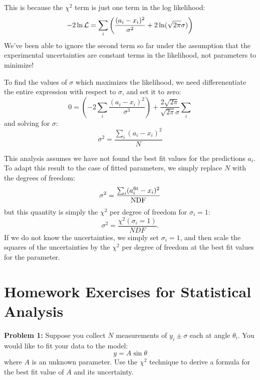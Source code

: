 \documentclass[12pt,oneside]{book}
\begin{document}
This is because the $\chi^2$ term is just one term in the log likelihood:
\begin{equation*}
-2 \ln {\cal L} = \sum_i \left( \frac{(a_i-x_i)^2}{\sigma^2} + 2 \ln(\sqrt{2\pi}\sigma)\right)
\end{equation*}
We've been able to ignore the second term so far under the assumption
that the experimental uncertainties are constant terms in the
likelihood, not parameters to minimize!

To find the values of $\sigma$ which maximizes the likelihood, we need differenentiate the entire expression with respect to $\sigma$, and set it to zero:
\begin{equation*}
0 = \left( - 2 \sum_i \frac{(a_i-x_i)^2}{\sigma^3} \right)+\frac{2\sqrt{2\pi}}{\sqrt{2\pi}\sigma}\sum_i 
\end{equation*}
and solving for $\sigma$:
\begin{equation}
\sigma^2 = \frac{\sum_i (a_i-x_i)^2}{N} 
\end{equation}

This analysis assumes we have not found the best fit values for the
predictions $a_i$.  To adapt this result to the case of fitted
parameters, we simply replace $N$ with the degrees of freedom:
\begin{displaymath}
\sigma^2 = \frac{\sum_i (a_i^{\rm fit}-x_i)^2}{\rm NDF}
\end{displaymath}
but this quantity is simply the $\chi^2$ per degree of freedom for $\sigma_i = 1$:
\begin{displaymath}
\sigma^2 = \frac{\chi^2(\sigma_i = 1)}{NDF}.
\end{displaymath}
If we do not know the uncertainties, we simply set $\sigma_i = 1$, and
then scale the squares of the uncertainties by the $\chi^2$ per
degree of freedom at the best fit values for the parameter.

\newpage

\section{Homework Exercises for Statistical Analysis}

\vskip 1cm
\noindent
{\bf Problem 1:}  Suppose you collect $N$ measurements of $y_i \pm \sigma$ each at angle $\theta_i$.  You would like to fit your data to the model:
\begin{displaymath}
y = A \sin \theta
\end{displaymath}
where $A$ is an unknown parameter.  Use the $\chi^2$ technique to derive a formula for the best fit value of $A$ and its uncertainty.
\end{document}
